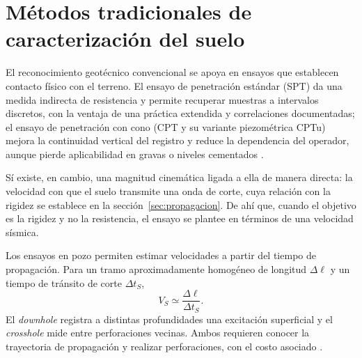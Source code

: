 \section{Métodos tradicionales de caracterización del suelo}
\label{sec:tradicionales}

El reconocimiento geotécnico convencional se apoya en ensayos que establecen contacto físico con el terreno. El ensayo de penetración estándar (SPT) da una medida indirecta de resistencia y permite recuperar muestras a intervalos discretos, con la ventaja de una práctica extendida y correlaciones documentadas; el ensayo de penetración con cono (CPT y su variante piezométrica CPTu) mejora la continuidad vertical del registro y reduce la dependencia del operador, aunque pierde aplicabilidad en gravas o niveles cementados .

 Sí existe, en cambio, una magnitud cinemática ligada a ella de manera directa: la velocidad con que el suelo transmite una onda de corte, cuya relación con la rigidez se establece en la sección~\ref{sec:propagacion}. De ahí que, cuando el objetivo es la rigidez y no la resistencia, el ensayo se plantee en términos de una velocidad sísmica.

Los ensayos en pozo permiten estimar velocidades a partir del tiempo de propagación. Para un tramo aproximadamente homogéneo de longitud $\Delta\ell$ y un tiempo de tránsito de corte $\Delta t_S$,
\begin{equation}
V_S\simeq\frac{\Delta\ell}{\Delta t_S}.
\label{eq:velocidad-transito}
\end{equation}
El \emph{downhole} registra a distintas profundidades una excitación superficial y el \emph{crosshole} mide entre perforaciones vecinas. Ambos requieren conocer la trayectoria de propagación y realizar perforaciones, con el costo asociado .

